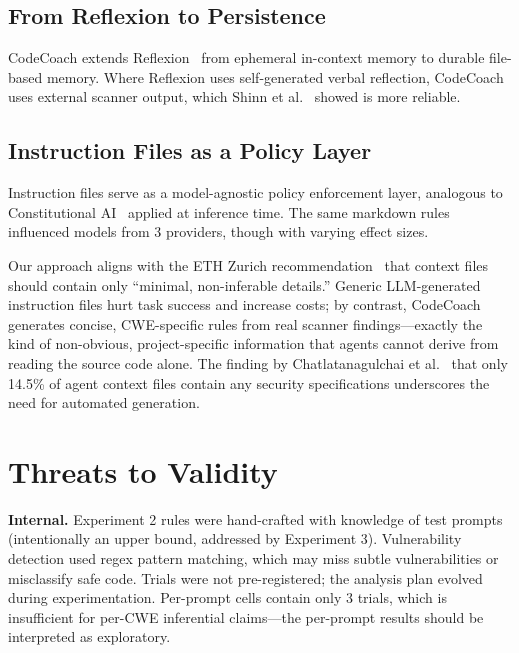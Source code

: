 \documentclass[conference,10pt]{IEEEtran}
\begin{document}
\subsection{From Reflexion to Persistence}

CodeCoach extends Reflexion~\cite{reflexion} from ephemeral in-context memory to durable file-based memory. Where Reflexion uses self-generated verbal reflection, CodeCoach uses external scanner output, which Shinn et al.~\cite{shinn-correction} showed is more reliable.

\subsection{Instruction Files as a Policy Layer}

Instruction files serve as a model-agnostic policy enforcement layer, analogous to Constitutional AI~\cite{constitutional-ai} applied at inference time. The same markdown rules influenced models from 3 providers, though with varying effect sizes.

Our approach aligns with the ETH Zurich recommendation~\cite{eth-agents-md} that context files should contain only ``minimal, non-inferable details.'' Generic LLM-generated instruction files hurt task success and increase costs; by contrast, CodeCoach generates concise, CWE-specific rules from real scanner findings---exactly the kind of non-obvious, project-specific information that agents cannot derive from reading the source code alone. The finding by Chatlatanagulchai et al.~\cite{agent-readmes} that only 14.5\% of agent context files contain any security specifications underscores the need for automated generation.

\section{Threats to Validity}

\textbf{Internal.} Experiment 2 rules were hand-crafted with knowledge of test prompts (intentionally an upper bound, addressed by Experiment 3). Vulnerability detection used regex pattern matching, which may miss subtle vulnerabilities or misclassify safe code. Trials were not pre-registered; the analysis plan evolved during experimentation. Per-prompt cells contain only 3 trials, which is insufficient for per-CWE inferential claims---the per-prompt results should be interpreted as exploratory.
\end{document}
